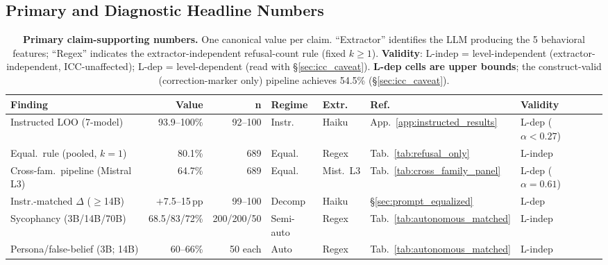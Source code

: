 \subsection{Primary and Diagnostic Headline Numbers}\label{app:headlines}

\begin{table}[h]
\centering
\caption{\textbf{Primary claim-supporting numbers.} One canonical value per claim. ``Extractor'' identifies the LLM producing the 5 behavioral features; ``Regex'' indicates the extractor-independent refusal-count rule (fixed $k\!\geq\!1$). \textbf{Validity}: L-indep = level-independent (extractor-independent, ICC-unaffected); L-dep = level-dependent (read with §\ref{sec:icc_caveat}). \textbf{L-dep cells are upper bounds}; the construct-valid (correction-marker only) pipeline achieves 54.5\% (§\ref{sec:icc_caveat}).}
\label{tab:headlines_primary}
\label{tab:headlines}
\begin{scriptsize}
\setlength{\tabcolsep}{3pt}
\begin{tabular}{lrrlllll}
\toprule
\textbf{Finding} & \textbf{Value} & \textbf{n} & \textbf{Regime} & \textbf{Extr.} & \textbf{Ref.} & \textbf{Validity} \\
\midrule
Instructed LOO (7-model) & 93.9--100\% & 92--100 & Instr. & Haiku & App.~\ref{app:instructed_results} & L-dep ($\alpha{<}0.27$) \\
Equal.\ rule (pooled, $k\!=\!1$) & 80.1\% & 689 & Equal. & Regex & Tab.~\ref{tab:refusal_only} & L-indep \\
Cross-fam.\ pipeline (Mistral L3) & 64.7\% & 689 & Equal. & Mist.\ L3 & Tab.~\ref{tab:cross_family_panel} & L-dep ($\alpha{=}0.61$) \\
Instr.-matched $\Delta$ ($\geq$14B) & $+$7.5--15\,pp & 99--100 & Decomp & Haiku & \S\ref{sec:prompt_equalized} & L-dep \\
Sycophancy (3B/14B/70B) & 68.5/83/72\% & 200/200/50 & Semi-auto & Regex & Tab.~\ref{tab:autonomous_matched} & L-indep \\
Persona/false-belief (3B; 14B) & 60--66\% & 50 each & Auto & Regex & Tab.~\ref{tab:autonomous_matched} & L-indep \\
\bottomrule
\end{tabular}
\end{scriptsize}
\end{table}

